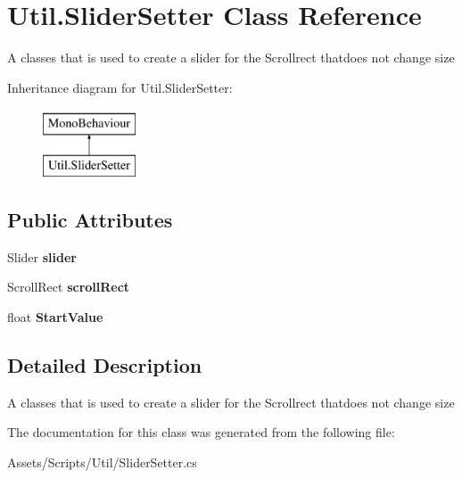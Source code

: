 \hypertarget{class_util_1_1_slider_setter}{}\section{Util.\+Slider\+Setter Class Reference}
\label{class_util_1_1_slider_setter}


A classes that is used to create a slider for the Scrollrect thatdoes not change size  


Inheritance diagram for Util.\+Slider\+Setter\+:\begin{figure}[H]
\begin{center}
\leavevmode
\includegraphics[height=2.000000cm]{class_util_1_1_slider_setter}
\end{center}
\end{figure}
\subsection*{Public Attributes}
\begin{DoxyCompactItemize}
\item 
Slider {\bfseries slider}\hypertarget{class_util_1_1_slider_setter_a62cd8a868eabb986ab3207035ec40267}{}\label{class_util_1_1_slider_setter_a62cd8a868eabb986ab3207035ec40267}

\item 
Scroll\+Rect {\bfseries scroll\+Rect}\hypertarget{class_util_1_1_slider_setter_a3caf6d33b16290ff116a131dad12104a}{}\label{class_util_1_1_slider_setter_a3caf6d33b16290ff116a131dad12104a}

\item 
float {\bfseries Start\+Value}\hypertarget{class_util_1_1_slider_setter_a0df4f45f646465e46667bcac0b6ef2e5}{}\label{class_util_1_1_slider_setter_a0df4f45f646465e46667bcac0b6ef2e5}

\end{DoxyCompactItemize}


\subsection{Detailed Description}
A classes that is used to create a slider for the Scrollrect thatdoes not change size 



The documentation for this class was generated from the following file\+:\begin{DoxyCompactItemize}
\item 
Assets/\+Scripts/\+Util/Slider\+Setter.\+cs\end{DoxyCompactItemize}
